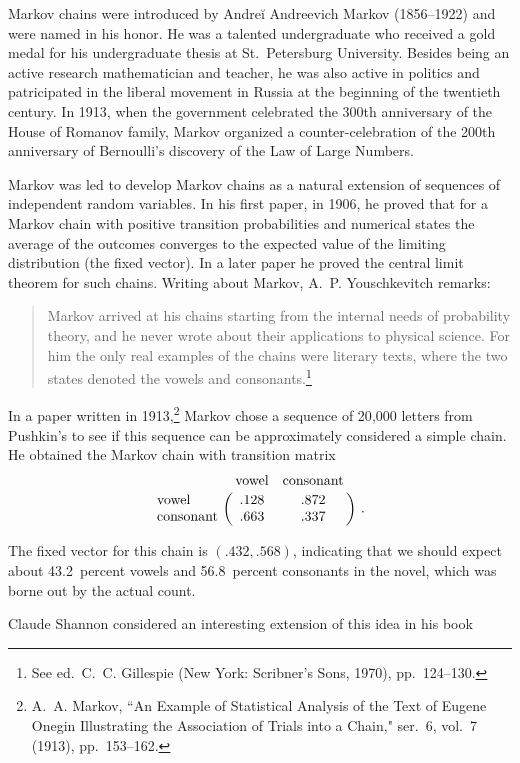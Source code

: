 Markov chains were introduced by Andre\u i Andreevich Markov (1856--1922) and
were named in his honor.  He was a talented undergraduate who received a gold
medal for his undergraduate thesis at St.~Petersburg University.  Besides being
an active research mathematician and teacher, he was also active in politics
and patricipated in the liberal movement in Russia at the beginning of the
twentieth century.  In 1913, when the government celebrated the 300th
anniversary of the House of Romanov family, Markov organized a 
counter-celebration of the 200th anniversary of Bernoulli's discovery of the 
Law of Large Numbers.
\par
Markov was led to develop Markov chains as a natural extension of sequences of
independent random variables.  In his first paper, in 1906, he proved that for
a Markov chain with positive transition probabilities and numerical states the
average of the outcomes converges to the expected value of the limiting
distribution (the fixed vector).  In a later paper he proved the central limit
theorem for such chains.  Writing about Markov, A.~P. Youschkevitch remarks:
\begin{quote}
Markov arrived at his chains starting from the internal needs of probability
theory, and he never wrote about their applications to physical science.  For
him the only real examples of the chains were literary texts, where the two
states denoted the vowels and consonants.\footnote{See  ed.~C.~C. Gillespie (New York: Scribner's Sons, 1970),
pp.~124--130.}
\end{quote}
\par
In a paper written in 1913,\footnote{A.~A. Markov, ``An Example of Statistical
Analysis of the Text of Eugene Onegin Illustrating the Association of Trials
into a Chain,"  ser.~6, vol.~7 (1913), pp.~153--162.} Markov chose a sequence
of 20{,}000 letters from Pushkin's  to see if this
sequence can be approximately considered a simple chain.  He obtained the
Markov chain with transition matrix
$$
\bordermatrix{
& \mbox{vowel} & \mbox{consonant} \cr
\mbox{vowel} & .128 & .872 \cr
\mbox{consonant} & .663 & .337}\ .
$$
\par
The fixed vector for this chain is $(.432, .568)$, indicating that we should
expect about 43.2~percent vowels and 56.8~percent consonants in the novel,
which was borne out by the actual count.
\par
Claude Shannon considered an interesting extension of this idea in his book

